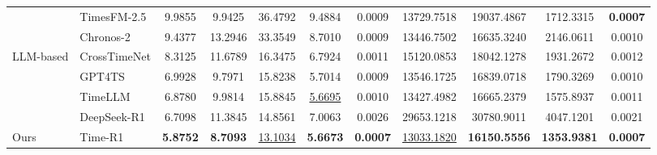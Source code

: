 \begin{table}[ht]
{\begin{tabular}{ll|ccccccccc}
        & TimesFM-2.5 & 9.9855 & 9.9425 & 36.4792 & 9.4884 & 0.0009 & 13729.7518 & 19037.4867 & 1712.3315 & \textbf{0.0007} \\
        
        & Chronos-2 & 9.4377 & 13.2946 & 33.3549 & 8.7010 & 0.0009 & 13446.7502 & 16635.3240 & 2146.0611 & 0.0010 \\
        
        \hline
        \multirow{4}{*}{LLM-based} & CrossTimeNet &8.3125 & 11.6789 & 16.3475 & 6.7924 & 0.0011 & 15120.0853 & 18042.1278 & 1931.2672 & 0.0012  \\        
        & GPT4TS &  6.9928&  9.7971&  15.8238&  5.7014&  0.0009&  13546.1725&  16839.0718&  1790.3269&  0.0010\\
        & TimeLLM &  6.8780&  9.9814&  15.8845&  \underline{5.6695}&  0.0010&  13427.4982&  16665.2379&  1575.8937&  0.0011\\
        & DeepSeek-R1 & 6.7098 & 11.3845 & 14.8561 & 7.0063 & 0.0026 & 29653.1218 & 30780.9011 & 4047.1201 & 0.0021\\
        \hline
        \cellcolor{lightgray!30}Ours & \cellcolor{lightgray!30}Time-R1    & \cellcolor{lightgray!30}\textbf{5.8752}    & \cellcolor{lightgray!30}\textbf{8.7093}      & \cellcolor{lightgray!30}\underline{13.1034}& \cellcolor{lightgray!30}\textbf{5.6673}& \cellcolor{lightgray!30}\textbf{0.0007}& \cellcolor{lightgray!30}\underline{13033.1820}  & \cellcolor{lightgray!30}\textbf{16150.5556}    & \cellcolor{lightgray!30}\textbf{1353.9381}& \cellcolor{lightgray!30}\textbf{0.0007} \\
        \bottomrule
    \end{tabular}
}
\end{table}